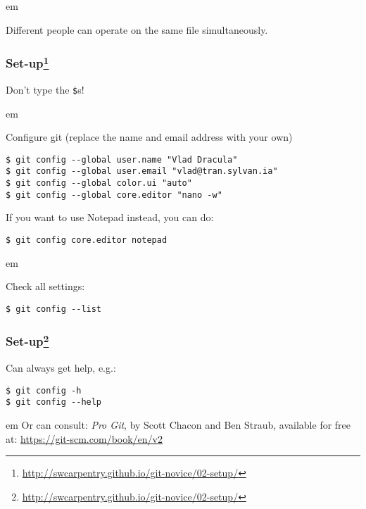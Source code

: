\documentclass{beamer}
\begin{document}
\begin{frame}
{\begin{minipage}{\textwidth}
\begin{tikzpicture}[y=0.80pt,x=0.80pt,yscale=-1, inner sep=0pt, outer sep=0pt]
  \end{tikzpicture}
\end{minipage}
}
\pause

 em

Different people can operate on the same file simultaneously.

\end{frame}

\begin{frame}[fragile]
\frametitle{Set-up\footnote{\url{http://swcarpentry.github.io/git-novice/02-setup/}}}

\textcolor{red!50!black}{Don't type the \texttt{\$}s!}

 em

Configure git (replace the name and email address with your own)
\begin{verbatim}
$ git config --global user.name "Vlad Dracula"
$ git config --global user.email "vlad@tran.sylvan.ia"
$ git config --global color.ui "auto"
$ git config --global core.editor "nano -w"
\end{verbatim}

If you want to use Notepad instead, you can do:
\begin{verbatim}
$ git config core.editor notepad
\end{verbatim}

\pause

 em

Check all settings:
\begin{verbatim}
$ git config --list
\end{verbatim}

\end{frame}

\begin{frame}[fragile]
\frametitle{Set-up\footnote{\url{http://swcarpentry.github.io/git-novice/02-setup/}}}

Can always get help, e.g.:
\begin{verbatim}
$ git config -h
$ git config --help
\end{verbatim}

 em
Or can consult: \textit{Pro Git}, by Scott Chacon and Ben Straub, available for free at: \url{https://git-scm.com/book/en/v2}

\end{frame}
\end{document}
